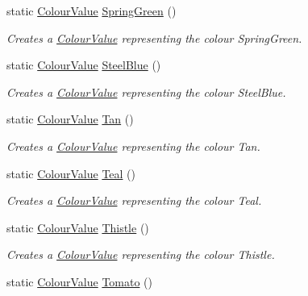 \begin{DoxyCompactItemize}
static \hyperlink{classMezzanine_1_1ColourValue}{ColourValue} \hyperlink{classMezzanine_1_1ColourValue_a86749dff6a755eaf9d9609e2fd95e150}{SpringGreen} ()
\begin{DoxyCompactList}\small\item\em Creates a \hyperlink{classMezzanine_1_1ColourValue}{ColourValue} representing the colour SpringGreen. \item\end{DoxyCompactList}\item 
static \hyperlink{classMezzanine_1_1ColourValue}{ColourValue} \hyperlink{classMezzanine_1_1ColourValue_a89059f595e566b96dfb2304e5f21e1c7}{SteelBlue} ()
\begin{DoxyCompactList}\small\item\em Creates a \hyperlink{classMezzanine_1_1ColourValue}{ColourValue} representing the colour SteelBlue. \item\end{DoxyCompactList}\item 
static \hyperlink{classMezzanine_1_1ColourValue}{ColourValue} \hyperlink{classMezzanine_1_1ColourValue_a9c54959ddd92cba81fd3fbda2d921e9b}{Tan} ()
\begin{DoxyCompactList}\small\item\em Creates a \hyperlink{classMezzanine_1_1ColourValue}{ColourValue} representing the colour Tan. \item\end{DoxyCompactList}\item 
static \hyperlink{classMezzanine_1_1ColourValue}{ColourValue} \hyperlink{classMezzanine_1_1ColourValue_a0b43523f6f1a94ddaa5cebf057672b1f}{Teal} ()
\begin{DoxyCompactList}\small\item\em Creates a \hyperlink{classMezzanine_1_1ColourValue}{ColourValue} representing the colour Teal. \item\end{DoxyCompactList}\item 
static \hyperlink{classMezzanine_1_1ColourValue}{ColourValue} \hyperlink{classMezzanine_1_1ColourValue_a9c3721723c4289455a790ced4d9c1cc1}{Thistle} ()
\begin{DoxyCompactList}\small\item\em Creates a \hyperlink{classMezzanine_1_1ColourValue}{ColourValue} representing the colour Thistle. \item\end{DoxyCompactList}\item 
static \hyperlink{classMezzanine_1_1ColourValue}{ColourValue} \hyperlink{classMezzanine_1_1ColourValue_a3668b75e35de6edb4428b0259fee30cb}{Tomato} ()

\end{DoxyCompactItemize}
